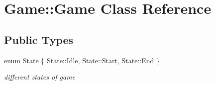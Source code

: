 \hypertarget{class_game_1_1_game}{}\section{Game\+:\+:Game Class Reference}
\label{class_game_1_1_game}
\subsection*{Public Types}
\begin{DoxyCompactItemize}
\item 
enum \hyperlink{class_game_1_1_game_a372bbb1ac29108132252ef735f03867f}{State} \{ \hyperlink{class_game_1_1_game_a372bbb1ac29108132252ef735f03867fae599161956d626eda4cb0a5ffb85271c}{State\+::\+Idle}, 
\hyperlink{class_game_1_1_game_a372bbb1ac29108132252ef735f03867faa6122a65eaa676f700ae68d393054a37}{State\+::\+Start}, 
\hyperlink{class_game_1_1_game_a372bbb1ac29108132252ef735f03867fa87557f11575c0ad78e4e28abedc13b6e}{State\+::\+End}
 \}\begin{DoxyCompactList}\small\item\em different states of game \end{DoxyCompactList}
\end{DoxyCompactItemize}
